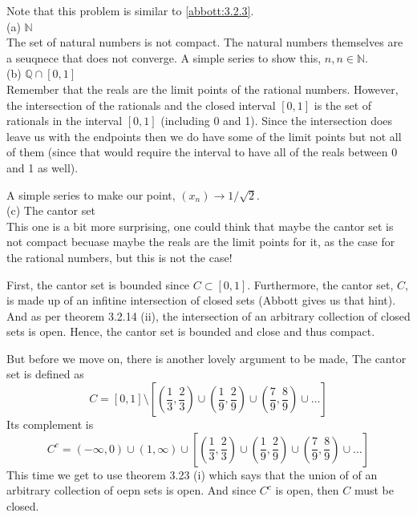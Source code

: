 Note that this problem is similar to \ref{abbott:3.2.3}.
\\

(a) $\mathbb{N}$
\\

The set of natural numbers is not compact.
The natural numbers themselves are a seuqnece that does not converge.
A simple series to show this, $n, n\in\mathbb{N}$.
\\

(b) $\mathbb{Q} \cap [0,1]$
\\

Remember that the reals are the limit points of the rational numbers.
However, the intersection of the rationals and the closed interval $[0,1]$
is the set of rationals in the interval $[0,1]$ (including 0 and 1).
Since the intersection does leave us with the endpoints then we do have some of the limit points
but not all of them (since that would require the interval to have all of the reals between 0 and 1 as well).

A simple series to make our point, $(x_n) \rightarrow 1/\sqrt{2}$.
\\

(c) The cantor set
\\

This one is a bit more surprising, one could think that maybe the cantor set is not compact
becuase maybe the reals are the limit points for it, as the case for the rational numbers, but this is not the case!

First, the cantor set is bounded since $C \subset [0,1]$.
Furthermore, the cantor set, $C$, is made up of an infitine intersection of closed sets (Abbott gives us that hint).
And as per theorem 3.2.14 (ii), the intersection of an arbitrary collection of closed sets is open.
Hence, the cantor set is bounded and close and thus compact.

But before we move on, there is another lovely argument to be made,
The cantor set is defined as
$$
C = [0,1] \setminus 
\left[
    \left(\frac{1}{3}, \frac{2}{3}\right) \cup
    \left(\frac{1}{9}, \frac{2}{9}\right) \cup
    \left(\frac{7}{9}, \frac{8}{9}\right) \cup
    \ldots
\right]
$$
Its complement is
$$
C^c = (-\infty, 0) \cup (1, \infty) \cup
\left[
    \left(\frac{1}{3}, \frac{2}{3}\right) \cup
    \left(\frac{1}{9}, \frac{2}{9}\right) \cup
    \left(\frac{7}{9}, \frac{8}{9}\right) \cup
    \ldots
\right]
$$
This time we get to use theorem 3.23 (i) which says that the union of of an arbitrary collection of oepn sets is open.
And since $C^c$ is open, then $C$ must be closed.
\\

